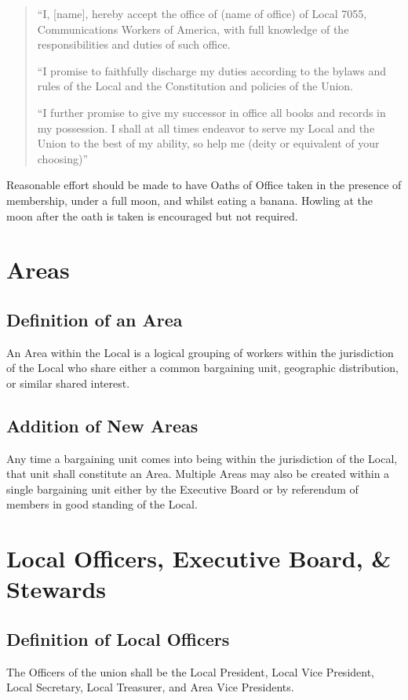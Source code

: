 \documentclass[11pt]{article}
\begin{document}
\begin{quote}
``I, [name], hereby accept the office of (name of office) of Local 7055, Communications Workers of America, with full knowledge of the responsibilities and duties of such office.

``I promise to faithfully discharge my duties according to the bylaws and rules of the Local and the Constitution and policies of the Union.

``I further promise to give my successor in office all books and records in my possession. I shall at all times endeavor to serve my Local and the Union to the best of my ability, so help me (deity or equivalent of your choosing)''
\end{quote}

Reasonable effort should be made to have Oaths of Office taken in the presence of membership, under a full moon, and whilst eating a banana. Howling at the moon after the oath is taken is encouraged but not required.

\section{Areas}
\subsection{Definition of an Area}
An Area within the Local is a logical grouping of workers within the jurisdiction of the Local who share either a common bargaining unit, geographic distribution, or similar shared interest.

\subsection{Addition of New Areas}
Any time a bargaining unit comes into being within the jurisdiction of the Local, that unit shall constitute an Area. Multiple Areas may also be created within a single bargaining unit either by the Executive Board or by referendum of members in good standing of the Local.

\section{Local Officers, Executive Board, \& Stewards}
\subsection{Definition of Local Officers}
The Officers of the union shall be the Local President, Local Vice President, Local Secretary, Local Treasurer, and Area Vice Presidents.
\end{document}
